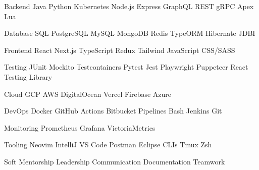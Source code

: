 

\begin{cvskills}

  \cvskill
    {Backend} %
    {Java \cpshalf Python \cpshalf Kubernetes \cpshalf Node.js \cpshalf Express \cpshalf GraphQL \cpshalf REST \cpshalf gRPC \cpshalf Apex \cpshalf Lua } %

  \cvskill
    {Database} %
    {SQL \cpshalf PostgreSQL \cpshalf MySQL \cpshalf MongoDB \cpshalf Redis \cpshalf TypeORM \cpshalf Hibernate \cpshalf JDBI} %

  \cvskill
    {Frontend} %
    {React \cpshalf Next.js \cpshalf TypeScript \cpshalf Redux \cpshalf Tailwind \cpshalf JavaScript \cpshalf CSS/SASS} %

  \cvskill
    {Testing} %
    {JUnit \cpshalf Mockito \cpshalf Testcontainers \cpshalf Pytest \cpshalf Jest \cpshalf Playwright \cpshalf Puppeteer \cpshalf React Testing Library} %

  \cvskill
    {Cloud} %
    {GCP \cpshalf AWS \cpshalf DigitalOcean \cpshalf Vercel \cpshalf Firebase \cpshalf Azure} %

  \cvskill
    {DevOps} %
    {Docker \cpshalf GitHub Actions \cpshalf Bitbucket Pipelines \cpshalf Bash \cpshalf Jenkins \cpshalf Git} %


  \cvskill
  {Monitoring} %
    {Prometheus \cpshalf Grafana \cpshalf VictoriaMetrics} %

  \cvskill
  {Tooling} %
    {Neovim \cpshalf IntelliJ \cpshalf VS Code \cpshalf Postman \cpshalf Eclipse \cpshalf CLIs \cpshalf Tmux \cpshalf Zsh} %

  \cvskill
  {Soft} %
    {Mentorship \cpshalf Leadership \cpshalf Communication \cpshalf Documentation \cpshalf Teamwork} %

\end{cvskills}
